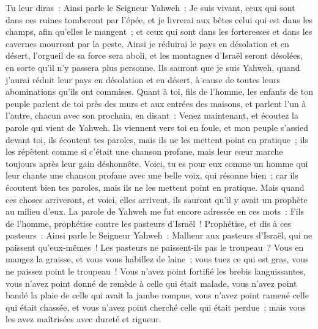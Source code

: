 \begin{multicols}{2}
Tu leur diras~: Ainsi parle le Seigneur Yahweh~: Je suis vivant, ceux qui sont dans ces ruines tomberont par l'épée, et je livrerai aux bêtes celui qui est dans les champs, afin qu'elles le mangent~; et ceux qui sont dans les forteresses et dans les cavernes mourront par la peste.
Ainsi je réduirai le pays en désolation et en désert, l'orgueil de sa force sera aboli, et les montagnes d'Israël seront désolées, en sorte qu'il n'y passera plus personne.
Ils sauront que je suis Yahweh, quand j'aurai réduit leur pays en désolation et en désert, à cause de toutes leurs abominations qu'ils ont commises.
Quant à toi, fils de l'homme, les enfants de ton peuple parlent de toi près des murs et aux entrées des maisons, et parlent l'un à l'autre, chacun avec son prochain, en disant~: Venez maintenant, et écoutez la parole qui vient de Yahweh.
Ils viennent vers toi en foule, et mon peuple s'assied devant toi, ils écoutent tes paroles, mais ils ne les mettent point en pratique~; ils les répètent comme si c'était une chanson profane, mais leur cœur marche toujours après leur gain déshonnête.
Voici, tu es pour eux comme un homme qui leur chante une chanson profane avec une belle voix, qui résonne bien~; car ils écoutent bien tes paroles, mais ils ne les mettent point en pratique.
Mais quand ces choses arriveront, et voici, elles arrivent, ils sauront qu'il y avait un prophète au milieu d'eux.
\VerseOne{}La parole de Yahweh me fut encore adressée en ces mots~:
Fils de l'homme, prophétise contre les pasteurs d'Israël~! Prophétise, et dis à ces pasteurs~: Ainsi parle le Seigneur Yahweh~: Malheur aux pasteurs d'Israël, qui ne paissent qu'eux-mêmes~! Les pasteurs ne paissent-ils pas le troupeau~?
Vous en mangez la graisse, et vous vous habillez de laine~; vous tuez ce qui est gras, vous ne paissez point le troupeau~!
Vous n'avez point fortifié les brebis languissantes, vous n'avez point donné de remède à celle qui était malade, vous n'avez point bandé la plaie de celle qui avait la jambe rompue, vous n'avez point ramené celle qui était chassée, et vous n'avez point cherché celle qui était perdue~; mais vous les avez maîtrisées avec dureté et rigueur.

\end{multicols}
